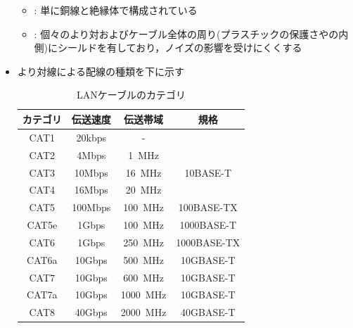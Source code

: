 \documentclass[a4paper]{ltjsarticle}
\begin{document}
\begin{itemize}
\begin{itemize}
					\item {} : 単に銅線と絶縁体で構成されている
					\item {} : 個々のより対およびケーブル全体の周り(プラスチックの保護さやの内側)にシールドを有しており，ノイズの影響を受けにくくする
				\end{itemize}
				\item より対線による配線の種類を下に示す\cite{lan}
					\begin{table}[H]
						\centering
						\caption{LANケーブルのカテゴリ}
						\begin{tabular}{c|c|c|c}
							カテゴリ & 伝送速度 & 伝送帯域 & 規格 \\ \hline
							CAT1 & 20kbps & - & \\
							CAT2 & 4Mbps & \SI{1}{MHz} & \\
							CAT3 & 10Mbps & \SI{16}{MHz} & 10BASE-T\\
							CAT4 & 16Mbps & \SI{20}{MHz} & \\
							CAT5 & 100Mbps & \SI{100}{MHz} & 100BASE-TX\\
							CAT5e & 1Gbps & \SI{100}{MHz} & 1000BASE-T\\
							CAT6 & 1Gbps & \SI{250}{MHz} & 1000BASE-TX\\
							CAT6a & 10Gbps & \SI{500}{MHz} & 10GBASE-T\\
							CAT7 & 10Gbps & \SI{600}{MHz} & 10GBASE-T\\
							CAT7a & 10Gbps & \SI{1000}{MHz} & 10GBASE-T\\
							CAT8 & 40Gbps & \SI{2000}{MHz} & 40GBASE-T\\
						\end{tabular}
					\end{table}
			\end{itemize}
\end{document}
